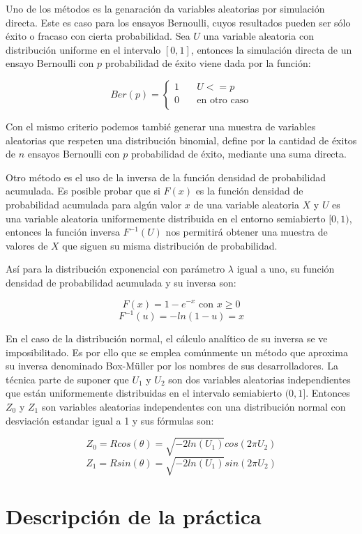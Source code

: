 \documentclass[11pt]{article}
\begin{document}
Uno de los métodos es la genaración da variables aleatorias 
por simulación directa. Este es caso para los ensayos Bernoulli,
cuyos resultados pueden ser sólo éxito o fracaso con cierta 
probabilidad. Sea $U$ una variable aleatoria con distribución
uniforme en el intervalo $[0, 1]$, entonces la simulación
directa de un ensayo Bernoulli con $p$ probabilidad de 
éxito viene dada por la función:

\[   
Ber(p) = 
     \begin{cases}
       1 &\quad U <= p\\
       0 &\quad\text{en otro caso}\\
     \end{cases}
\]

Con el mismo criterio podemos tambié generar una muestra de 
variables aleatorias que respeten una distribución binomial, 
define por la cantidad de éxitos de $n$ ensayos Bernoulli con 
$p$ probabilidad de éxito, mediante una suma directa.

Otro método es el uso de la inversa de la función densidad
de probabilidad acumulada. Es posible probar que si $F(x)$ es
la función densidad de probabilidad acumulada para algún 
valor $x$ de una variable aleatoria $X$ y $U$ es una variable
aleatoria uniformemente distribuida en el entorno
semiabierto $[0, 1)$,
entonces la función inversa $F^{-1}(U)$ nos permitirá obtener
una muestra de valores de $X$ que siguen su misma distribución
de probabilidad.

Así para la distribución exponencial con parámetro $\lambda$ 
igual a uno, su función densidad de probabilidad acumulada y 
su inversa son:

\[F(x) = 1 - e^{-x} \text{ con } x \geq 0\]
\[F^{-1}(u) = -ln(1 - u) = x\]

En el caso de la distribución normal, el cálculo analítico de
su inversa se ve imposibilitado. Es por ello que se emplea 
comúnmente un método que aproxima su inversa denominado 
Box-Müller por los nombres de sus desarrolladores. 
La técnica parte de suponer que $U_1$ y $U_2$ son dos variables
 aleatorias independientes que están uniformemente distribuidas
 en el intervalo semiabierto $(0, 1]$. Entonces $Z_0$ y $Z_1$ 
 son variables aleatorias independentes con una distribución 
 normal con desviación estandar igual a 1 y sus fórmulas son:

 \[Z_0 = R cos(\theta) = \sqrt{-2 ln(U_1)}cos(2\pi U_2)\]
 \[Z_1 = R sin(\theta) = \sqrt{-2 ln(U_1)}sin(2\pi U_2)\]

\section{Descripción de la práctica}
\end{document}
